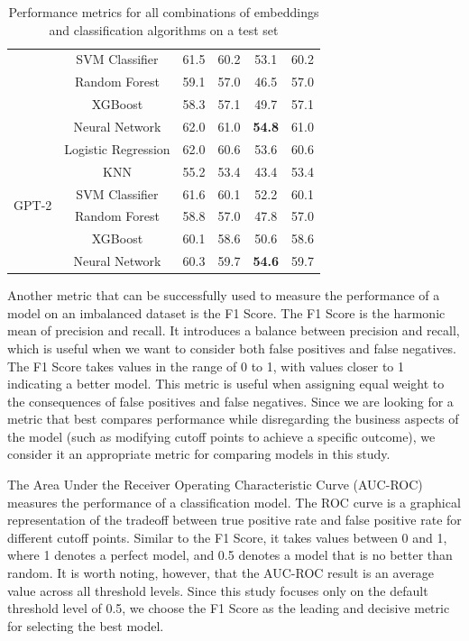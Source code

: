 \begin{table}[htb]
\begin{tabular}{l|c|c|c|c|c}
    & SVM Classifier & 61.5 & 60.2 & 53.1 & 60.2 \\
    & Random Forest & 59.1 & 57.0 & 46.5 & 57.0 \\
    & XGBoost & 58.3 & 57.1 & 49.7 & 57.1 \\
    & Neural Network & 62.0 & 61.0 & \textbf{54.8} & 61.0 \\
\hline
\multirow{6}{*}{GPT-2} 
    & Logistic Regression & 62.0 & 60.6 & 53.6 & 60.6 \\
    & KNN & 55.2 & 53.4 & 43.4 & 53.4 \\
    & SVM Classifier & 61.6 & 60.1 & 52.2 & 60.1 \\
    & Random Forest & 58.8 & 57.0 & 47.8 & 57.0 \\
    & XGBoost &  60.1 & 58.6 & 50.6 & 58.6 \\
    & Neural Network & 60.3 & 59.7 & \textbf{54.6} & 59.7 \\
\hline
\end{tabular}
\caption{Performance metrics for all combinations of embeddings and classification algorithms on a test set}
\label{results_table}
\end{table}

Another metric that can be successfully used to measure the performance of a model on an imbalanced dataset is the F1 Score. The F1 Score is the harmonic mean of precision and recall. It introduces a balance between precision and recall, which is useful when we want to consider both false positives and false negatives. The F1 Score takes values in the range of 0 to 1, with values closer to 1 indicating a better model. This metric is useful when assigning equal weight to the consequences of false positives and false negatives. Since we are looking for a metric that best compares performance while disregarding the business aspects of the model (such as modifying cutoff points to achieve a specific outcome), we consider it an appropriate metric for comparing models in this study.

The Area Under the Receiver Operating Characteristic Curve (AUC-ROC) measures the performance of a classification model. The ROC curve is a graphical representation of the tradeoff between true positive rate and false positive rate for different cutoff points. Similar to the F1 Score, it takes values between 0 and 1, where 1 denotes a perfect model, and 0.5 denotes a model that is no better than random. It is worth noting, however, that the AUC-ROC result is an average value across all threshold levels. Since this study focuses only on the default threshold level of 0.5, we choose the F1 Score as the leading and decisive metric for selecting the best model.


